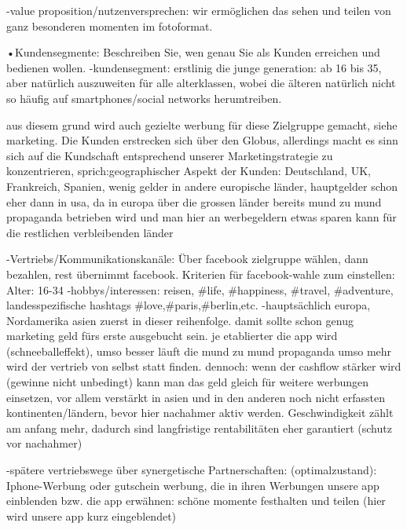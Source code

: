  -value proposition/nutzenversprechen: wir ermöglichen das sehen und teilen von ganz besonderen momenten im fotoformat.
 
 •Kundensegmente: Beschreiben Sie, wen genau Sie als Kunden erreichen und bedienen wollen.
 -kundensegment: erstlinig die junge generation: ab 16 bis 35, aber natürlich auszuweiten für alle alterklassen, wobei
 die älteren natürlich nicht so häufig auf smartphones/social networks herumtreiben. 
 
 aus diesem grund wird auch gezielte werbung für diese Zielgruppe gemacht, siehe marketing.
 Die Kunden erstrecken sich über den Globus, allerdings macht es sinn sich auf die Kundschaft entsprechend unserer Marketingstrategie zu konzentrieren,
 sprich:geographischer Aspekt der Kunden: Deutschland, UK, Frankreich, Spanien, wenig gelder in andere europische länder,
 hauptgelder schon eher dann in usa, da in europa über die grossen länder bereits mund zu mund propaganda betrieben wird 
 und man hier an werbegeldern etwas sparen kann für die restlichen verbleibenden länder
 
 -Vertriebs/Kommunikationskanäle:
 Über facebook zielgruppe wählen, dann bezahlen, rest übernimmt facebook.
 Kriterien für facebook-wahle zum einstellen:
 Alter: 16-34
 -hobbys/interessen: reisen, #life, #happiness, #travel, #adventure, landesspezifische hashtags #love,#paris,#berlin,etc.
 -hauptsächlich europa, Nordamerika asien  zuerst in dieser reihenfolge.
 damit sollte schon genug marketing geld fürs erste ausgebucht sein.
 je etablierter die app wird (schneeballeffekt), umso besser läuft die mund zu mund propaganda
 umso mehr wird der vertrieb von selbst statt finden. dennoch: wenn der cashflow stärker wird (gewinne nicht unbedingt)
 kann man das geld gleich für weitere werbungen einsetzen, vor allem verstärkt in asien und in den anderen noch nicht erfassten 
 kontinenten/ländern, bevor hier nachahmer aktiv werden. Geschwindigkeit zählt am anfang mehr, dadurch sind langfristige rentabilitäten eher garantiert (schutz vor nachahmer)
 
 
 -spätere vertriebswege über synergetische Partnerschaften:
 (optimalzustand): Iphone-Werbung oder gutschein werbung, die in ihren Werbungen unsere app einblenden
 bzw. die app erwähnen: schöne momente festhalten und teilen (hier wird unsere app kurz eingeblendet)

